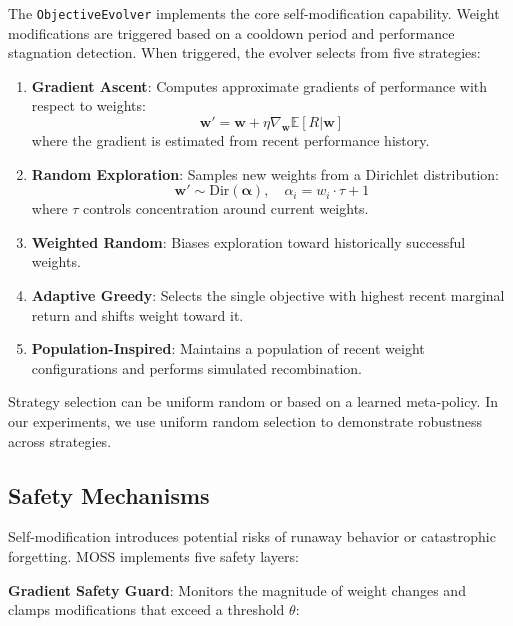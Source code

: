 \documentclass{article}
\begin{document}
The \texttt{ObjectiveEvolver} implements the core self-modification capability. Weight modifications are triggered based on a cooldown period and performance stagnation detection. When triggered, the evolver selects from five strategies:

\begin{enumerate}
    \item \textbf{Gradient Ascent}: Computes approximate gradients of performance with respect to weights:
    \begin{equation}
    \mathbf{w}' = \mathbf{w} + \eta \nabla_{\mathbf{w}} \mathbb{E}[R | \mathbf{w}]
    \end{equation}
    where the gradient is estimated from recent performance history.
    
    \item \textbf{Random Exploration}: Samples new weights from a Dirichlet distribution:
    \begin{equation}
    \mathbf{w}' \sim \text{Dir}(\boldsymbol{\alpha}), \quad \alpha_i = w_i \cdot \tau + 1
    \end{equation}
    where $\tau$ controls concentration around current weights.
    
    \item \textbf{Weighted Random}: Biases exploration toward historically successful weights.
    
    \item \textbf{Adaptive Greedy}: Selects the single objective with highest recent marginal return and shifts weight toward it.
    
    \item \textbf{Population-Inspired}: Maintains a population of recent weight configurations and performs simulated recombination.
\end{enumerate}

Strategy selection can be uniform random or based on a learned meta-policy. In our experiments, we use uniform random selection to demonstrate robustness across strategies.

\subsection{Safety Mechanisms}

Self-modification introduces potential risks of runaway behavior or catastrophic forgetting. MOSS implements five safety layers:

\textbf{Gradient Safety Guard}: Monitors the magnitude of weight changes and clamps modifications that exceed a threshold $\theta$:
\end{document}
